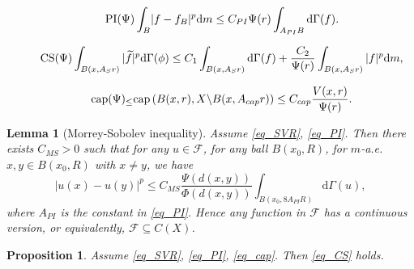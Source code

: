 \documentclass[10pt,a4paper]{amsart}
\newtheorem{proposition}{Proposition}
\newtheorem{lemma}{Lemma}
\begin{document}
\begin{equation*}\label{eq_PI}\tag*{$\text{PI}(\Psi)$}
\int_B\lvert f-f_B\rvert^p\mathrm{d} m\le C_{PI}\Psi(r)\int_{A_{PI}B}\mathrm{d}\Gamma(f).
\end{equation*}

\begin{equation*}\label{eq_CS}\tag*{$\text{CS}(\Psi)$}
\int_{B(x,A_{S}r)}|\widetilde{f}|^p \mathrm{d}\Gamma(\phi)\le C_{1}\int_{B(x,A_{S}r)}\mathrm{d}\Gamma(f)+\frac{C_{2}}{\Psi(r)}\int_{B(x,A_{S}r)}|f|^p\mathrm{d} m,
\end{equation*}

\begin{equation*}\label{eq_cap}\tag*{$\text{cap}(\Psi)_{\le}$}
\mathrm{cap}\left(B(x,r),X\backslash B(x,A_{cap}r)\right)\le C_{cap} \frac{V(x,r)}{\Psi(r)}.
\end{equation*}

\begin{lemma}[Morrey-Sobolev inequality]\label{lem_MS}
Assume \ref{eq_SVR}, \ref{eq_PI}. Then there exists $C_{MS}>0$ such that for any $u\in\mathcal{F}$, for any ball $B(x_0,R)$, for $m$-a.e. $x,y\in B(x_0,R)$ with $x\ne y$, we have
$$|u(x)-u(y)|^p\le C_{MS} \frac{\Psi(d(x,y))}{\Phi(d(x,y))}\int_{B(x_0,8A_{PI}R)}\mathrm{d}\Gamma(u),$$
where $A_{PI}$ is the constant in \ref{eq_PI}. Hence any function in $\mathcal{F}$ has a continuous version, or equivalently, $\mathcal{F}\subseteq C(X)$.
\end{lemma}

\begin{proposition}\label{prop_CS}
Assume \ref{eq_SVR}, \ref{eq_PI}, \ref{eq_cap}. Then \ref{eq_CS} holds.
\end{proposition}
\end{document}
